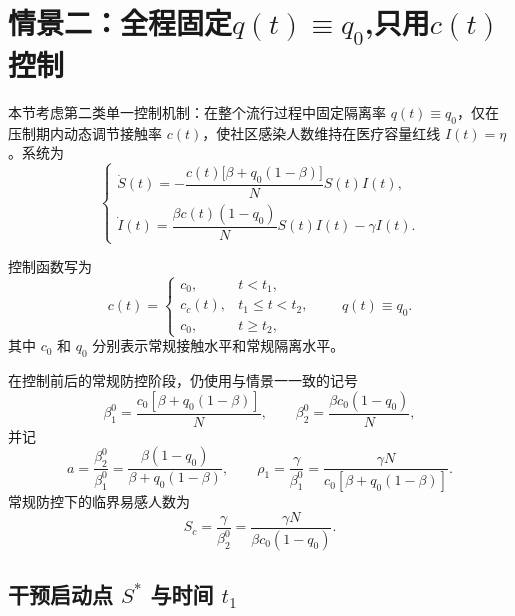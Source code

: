 \section{情景二：全程固定$q(t) \equiv q_0$,只用$c(t)$控制}
本节考虑第二类单一控制机制：在整个流行过程中固定隔离率
$q(t)\equiv q_0$，仅在压制期内动态调节接触率 $c(t)$，使社区感染人数维持在医疗容量红线
$I(t)=\eta$。系统为
\begin{equation}
\begin{cases}
\dot{S}(t)
=
-\dfrac{c(t)\big[\beta+q_0(1-\beta)\big]}{N}S(t)I(t), \\[.8em]
\dot{I}(t)
=
\dfrac{\beta c(t)(1-q_0)}{N}S(t)I(t)-\gamma I(t).
\end{cases}
\label{eq:s2:dynamics}
\end{equation}

控制函数写为
\begin{equation}
c(t)=
\begin{cases}
c_0, & t<t_1,\\
c_c(t), & t_1\leq t<t_2,\\
c_0, & t\geq t_2,
\end{cases}
\qquad
q(t)\equiv q_0 .
\label{eq:s2:piecewise-control}
\end{equation}
其中 $c_0$ 和 $q_0$ 分别表示常规接触水平和常规隔离水平。

在控制前后的常规防控阶段，仍使用与情景一一致的记号
\begin{equation}
\beta_1^0
=
\frac{c_0[\beta+q_0(1-\beta)]}{N},
\qquad
\beta_2^0
=
\frac{\beta c_0(1-q_0)}{N},
\label{eq:s2:beta12-phase0}
\end{equation}
并记
\begin{equation}
a=\frac{\beta_2^0}{\beta_1^0}
=
\frac{\beta(1-q_0)}{\beta+q_0(1-\beta)},
\qquad
\rho_1=\frac{\gamma}{\beta_1^0}
=
\frac{\gamma N}{c_0[\beta+q_0(1-\beta)]}.
\end{equation}
常规防控下的临界易感人数为
\begin{equation}
S_c
=
\frac{\gamma}{\beta_2^0}
=
\frac{\gamma N}{\beta c_0(1-q_0)}.
\label{eq:s2:Sc}
\end{equation}

\subsection{干预启动点 $S^*$ 与时间 $t_1$}


